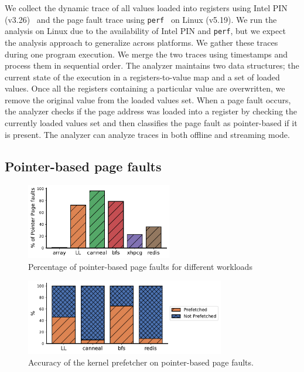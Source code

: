 We collect the dynamic trace of all values loaded into registers using Intel PIN (v3.26)~\cite{pin} and the page fault trace using \texttt{perf}~\cite{perf-probe} on Linux (v5.19). We run the analysis on Linux due to the availability of Intel PIN and \texttt{perf}, but we expect the analysis approach to generalize across platforms.
We gather these traces during one program execution. We merge the two traces using timestamps and process them in sequential order. The analyzer maintains two data structures; the current state of the execution in a registers-to-value map and a set of loaded values. Once all the registers containing a particular value are overwritten, we remove the original value from the loaded values set. When a page fault occurs, the analyzer checks if the page address was loaded into a register by checking the currently loaded values set and then classifies the page fault as pointer-based if it is present. The analyzer can analyze traces in both offline and streaming mode.

\subsection{Pointer-based page faults}
\begin{figure}
\includegraphics[height=3.3cm]{images/bar_graph.pdf}
\caption{Percentage of pointer-based page faults for different workloads}
\vspace{-0.25cm}
\label{fig:pointer_pagefaults}
\end{figure}

\begin{figure}
\includegraphics[height=3.3cm]{images/divided_bar_graph.pdf}
\caption{Accuracy of the kernel prefetcher on pointer-based page faults.}
\vspace{-0.25cm}
\label{fig:kernel_prefetcher_performance}
\end{figure}


